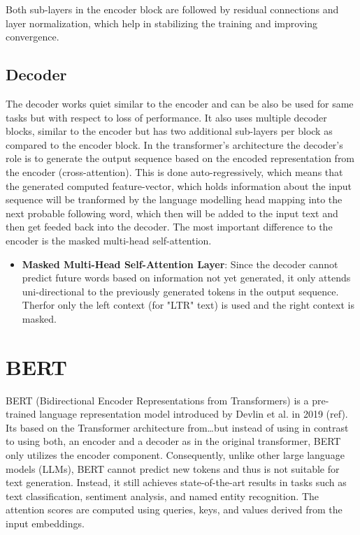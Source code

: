 Both sub-layers in the encoder block are followed by residual connections and layer normalization, which help in stabilizing the training and improving convergence.

\subsection{Decoder}
The decoder works quiet similar to the encoder and can be also be used for same tasks but with respect to loss of performance. It also uses multiple decoder blocks, similar to the encoder but has two additional sub-layers per block as compared to the encoder block. In the transformer's architecture the decoder's role is to generate the output sequence based on the encoded representation from the encoder (cross-attention). This is done auto-regressively, which means that the generated computed feature-vector, which holds information about the input sequence will be tranformed by the language modelling head mapping into the next probable following word, which then will be added to the input text and then get feeded back into the decoder. The most important difference to the encoder is the masked multi-head self-attention.

\begin{itemize}
    \item \textbf{Masked Multi-Head Self-Attention Layer}:
          Since the decoder cannot predict future words based on information not yet generated, it only attends uni-directional to the previously generated tokens in the output sequence. Therfor only the left context (for "LTR" text) is used and the right context is masked.
\end{itemize}





\section{BERT}
BERT (Bidirectional Encoder Representations from Transformers) is a  pre-trained language representation model introduced by Devlin et al. in 2019 (ref). Its based on the Transformer architecture from\dots but instead of using in contrast to using both, an encoder and a decoder as in the original transformer, BERT only utilizes the encoder component. Consequently, unlike other large language models (LLMs), BERT cannot predict new tokens and thus is not suitable for text generation. Instead, it still achieves state-of-the-art results in tasks such as text classification, sentiment analysis, and named entity recognition. The attention scores are computed using queries, keys, and values derived from the input embeddings.

